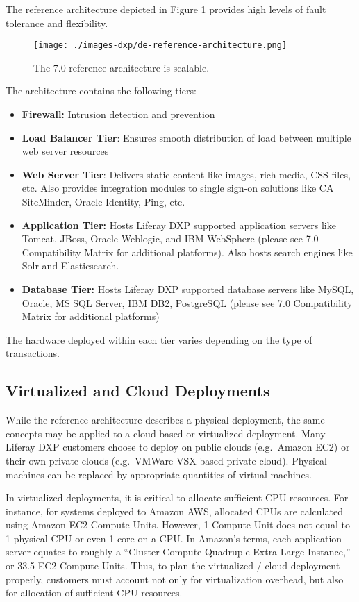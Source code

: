 The reference architecture depicted in Figure 1 provides high levels of
fault tolerance and flexibility.

\begin{figure}
\centering
\texttt{[image: ./images-dxp/de-reference-architecture.png]}
\caption{The 7.0 reference architecture is scalable.}
\end{figure}

The architecture contains the following tiers:

\begin{itemize}
\tightlist
\item
  \textbf{Firewall:} Intrusion detection and prevention
\item
  \textbf{Load Balancer Tier}: Ensures smooth distribution of load
  between multiple web server resources
\item
  \textbf{Web Server Tier}: Delivers static content like images, rich
  media, CSS files, etc. Also provides integration modules to single
  sign-on solutions like CA SiteMinder, Oracle Identity, Ping, etc.
\item
  \textbf{Application Tier:} Hosts Liferay DXP supported application
  servers like Tomcat, JBoss, Oracle Weblogic, and IBM WebSphere (please
  see 7.0 Compatibility Matrix for additional platforms). Also hosts
  search engines like Solr and Elasticsearch.
\item
  \textbf{Database Tier:} Hosts Liferay DXP supported database servers
  like MySQL, Oracle, MS SQL Server, IBM DB2, PostgreSQL (please see 7.0
  Compatibility Matrix for additional platforms)
\end{itemize}

The hardware deployed within each tier varies depending on the type of
transactions.

\subsection{Virtualized and Cloud
Deployments}\label{virtualized-and-cloud-deployments}

While the reference architecture describes a physical deployment, the
same concepts may be applied to a cloud based or virtualized deployment.
Many Liferay DXP customers choose to deploy on public clouds
(e.g.~Amazon EC2) or their own private clouds (e.g.~VMWare VSX based
private cloud). Physical machines can be replaced by appropriate
quantities of virtual machines.

In virtualized deployments, it is critical to allocate sufficient CPU
resources. For instance, for systems deployed to Amazon AWS, allocated
CPUs are calculated using Amazon EC2 Compute Units. However, 1 Compute
Unit does not equal to 1 physical CPU or even 1 core on a CPU. In
Amazon's terms, each application server equates to roughly a ``Cluster
Compute Quadruple Extra Large Instance,'' or 33.5 EC2 Compute Units.
Thus, to plan the virtualized / cloud deployment properly, customers
must account not only for virtualization overhead, but also for
allocation of sufficient CPU resources.

